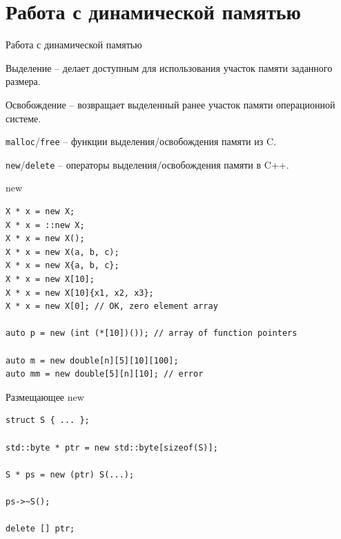 \documentclass[unknownkeysallowed,xcolor=table]{beamer}
\begin{document}

\section{Работа с динамической памятью}

\begin{frame}[fragile]{Работа с динамической памятью}

Выделение -- делает доступным для использования участок памяти заданного размера.

\vspace{1em}

Освобождение -- возвращает выделенный ранее участок памяти операционной системе.

\vspace{2em}

\lstinline{malloc}/\lstinline{free} -- функции выделения/освобождения памяти из C.

\vspace{1em}

\lstinline{new}/\lstinline{delete} -- операторы выделения/освобождения памяти в C++.

\end{frame}

\begin{frame}[fragile]{new}

\begin{lstlisting}
X * x = new X;
X * x = ::new X;
X * x = new X();
X * x = new X(a, b, c);
X * x = new X{a, b, c};
X * x = new X[10];
X * x = new X[10]{x1, x2, x3};
X * x = new X[0]; // OK, zero element array

auto p = new (int (*[10])()); // array of function pointers

auto m = new double[n][5][10][100];
auto mm = new double[5][n][10]; // error
\end{lstlisting}

\end{frame}

\begin{frame}[fragile]{Размещающее new}

\begin{lstlisting}
struct S { ... };

std::byte * ptr = new std::byte[sizeof(S)];

S * ps = new (ptr) S(...);

ps->~S();

delete [] ptr;

\end{lstlisting}

\end{frame}
\end{document}
